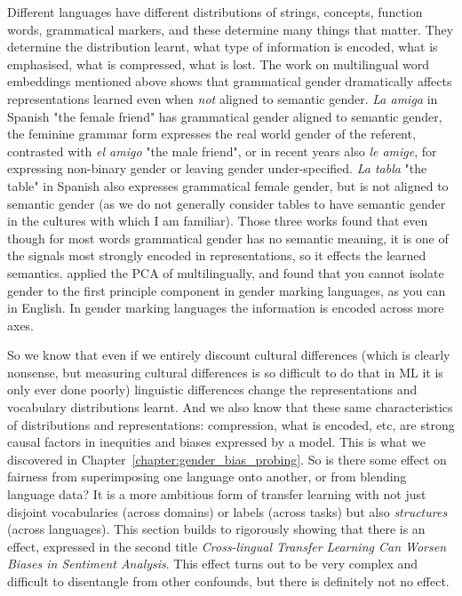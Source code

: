 Different languages have different distributions of strings, concepts, function words, grammatical markers, and these determine many things that matter. They determine the distribution learnt, what type of information is encoded, what is emphasised, what is compressed, what is lost. The work on multilingual word embeddings mentioned above \citep{gonen-etal-2019-grammatical, zhou-etal-2019-examining, McCurdy2017GrammaticalGA} shows that grammatical gender dramatically affects representations learned even when \textit{not} aligned to semantic gender. \textit{La amiga} in Spanish "the female friend" has grammatical gender aligned to semantic gender, the feminine grammar form expresses the real world gender of the referent, contrasted with \textit{el amigo} "the male friend", or in recent years also \textit{le amige}, for expressing non-binary gender or leaving gender under-specified. \textit{La tabla} "the table" in Spanish also expresses grammatical female gender, but is not aligned to semantic gender (as we do not generally consider tables to have semantic gender in the cultures with which I am familiar)\citep{corbett_non_canonical, corbett_1991}. Those three works found that even though for most words grammatical gender has no semantic meaning, it is one of the signals most strongly encoded in representations, so it effects the learned semantics. \citet{gonen-etal-2022-analyzing} applied the PCA of \citet{bolukbasi} multilingually, and found that you cannot isolate gender to the first principle component in gender marking languages, as you can in English. In gender marking languages the information is encoded across more axes.

So we know that even if we entirely discount cultural differences (which is clearly nonsense, but measuring cultural differences is so difficult to do that in ML it is only ever done poorly) linguistic differences change the representations and vocabulary distributions learnt. And we also know that these same characteristics of distributions and representations: compression, what is encoded, etc, are strong causal factors in inequities and biases expressed by a model. This is what we discovered in Chapter~\ref{chapter:gender_bias_probing}.  So is there some effect on fairness from superimposing one language onto another, or from blending language data? It is a more ambitious form of transfer learning with not just disjoint vocabularies (across domains) or labels (across tasks) but also \textit{structures} (across languages). This section builds to rigorously showing that there is an effect, expressed in the second title \textit{Cross-lingual Transfer Learning Can Worsen Biases in Sentiment Analysis}. This effect turns out to be very complex and difficult to disentangle from other confounds, but there is definitely not no effect. 

